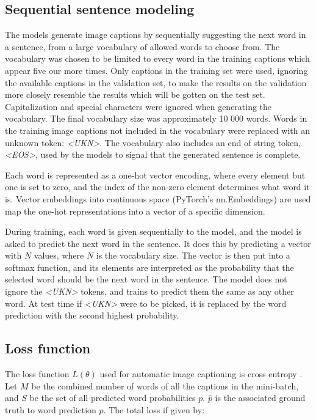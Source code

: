\documentclass[a4paper, twoside]{article}
\begin{document}
\subsection{Sequential sentence modeling}
The models generate image captions by sequentially suggesting the next word in a sentence, from a large vocabulary of allowed words to choose from. The vocabulary was chosen to be limited to every word in the training captions which appear five our more times. Only captions in the training set were used, ignoring the available captions in the validation set, to make the results on the validation more closely resemble the results which will be gotten on the test set. Capitalization and special characters were ignored when generating the vocabulary. The final vocabulary size was approximately 10 000 words. Words in the training image captions not included in the vocabulary were replaced with an unknown token: \textit{<UKN>}. The vocabulary also includes an end of string token, \textit{<EOS>}, used by the models to signal that the generated sentence is complete.

Each word is represented as a one-hot vector encoding, where every element but one is set to zero, and the index of the non-zero element determines what word it is. Vector embeddings into continuous space (PyTorch's nn.Embeddings) \cite{pytorch} are used map the one-hot representations into a vector of a specific dimension.

During training, each word is given sequentially to the model, and the model is asked to predict the next word in the sentence. It does this by predicting a vector with $N$ values, where $N$ is the vocabulary size. The vector is then put into a softmax function, and its elements are interpreted as the probability that the selected word should be the next word in the sentence. The model does not ignore the \textit{<UKN>} tokens, and trains to predict them the same as any other word. At test time if \textit{<UKN>} were to be picked, it is replaced by the word prediction with the second highest probability.

\subsection{Loss function}
The loss function $L(\theta)$ used for automatic image captioning is cross entropy \cite{notesonbackprop}. Let $M$ be the combined number of words of all the captions in the mini-batch, and $S$ be the set of all predicted word probabilities $p$. $\hat{p}$ is the associated ground truth to word prediction $p$. The total loss if given by:
\end{document}
